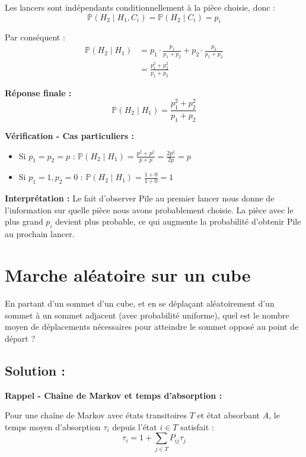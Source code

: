 Les lancers sont indépendants conditionnellement à la pièce choisie, donc :
\[
\mathbb{P}(H_2 \mid H_1, C_i) = \mathbb{P}(H_2 \mid C_i) = p_i
\]

Par conséquent :
\begin{align*}
\mathbb{P}(H_2 \mid H_1) &= p_1 \cdot \frac{p_1}{p_1 + p_2} + p_2 \cdot \frac{p_2}{p_1 + p_2} \\
&= \frac{p_1^2 + p_2^2}{p_1 + p_2}
\end{align*}

\textbf{Réponse finale :}
\[
\boxed{\mathbb{P}(H_2 \mid H_1) = \frac{p_1^2 + p_2^2}{p_1 + p_2}}
\]

\textbf{Vérification - Cas particuliers :}

\begin{itemize}
    \item Si $p_1 = p_2 = p$ : $\mathbb{P}(H_2 \mid H_1) = \frac{p^2 + p^2}{p + p} = \frac{2p^2}{2p} = p$ \quad {}
    \item Si $p_1 = 1, p_2 = 0$ : $\mathbb{P}(H_2 \mid H_1) = \frac{1 + 0}{1 + 0} = 1$ \quad {}
\end{itemize}

\textbf{Interprétation :} Le fait d'observer Pile au premier lancer nous donne de l'information sur quelle pièce nous avons probablement choisie. La pièce avec le plus grand $p_i$ devient plus probable, ce qui augmente la probabilité d'obtenir Pile au prochain lancer.



\section{Marche aléatoire sur un cube}

\begin{exerciseBox}
En partant d'un sommet d'un cube, et en se déplaçant aléatoirement d'un sommet à un sommet adjacent (avec probabilité uniforme), quel est le nombre moyen de déplacements nécessaires pour atteindre le sommet opposé au point de départ ?
\end{exerciseBox}

\subsection*{Solution :}

\textbf{Rappel - Chaîne de Markov et temps d'absorption :}

Pour une chaîne de Markov avec états transitoires $T$ et état absorbant $A$, le temps moyen d'absorption $\tau_i$ depuis l'état $i \in T$ satisfait :
\[
\tau_i = 1 + \sum_{j \in T} P_{ij} \tau_j
\]





